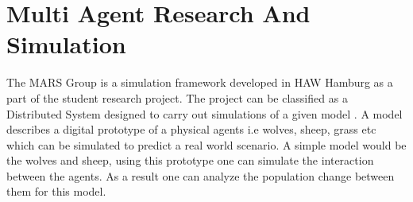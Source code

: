 
\section{Multi Agent Research And Simulation}
        \label{section:MARS}
        The MARS Group is a simulation framework developed 
        in HAW Hamburg as a  part of the student research project. The project can be classified as a
        Distributed System \cite{DistributedSystems} designed to carry out simulations of a given model 
        \cite{HAWHamburgMARS}. 
        A model describes a digital prototype of a physical agents i.e wolves, sheep, grass etc 
        which can be simulated to predict a real world scenario. A simple model would
        be the wolves and sheep, using this prototype one can simulate the interaction between the agents. 
        As a result one can analyze the population change between them for this model. 

        \par
